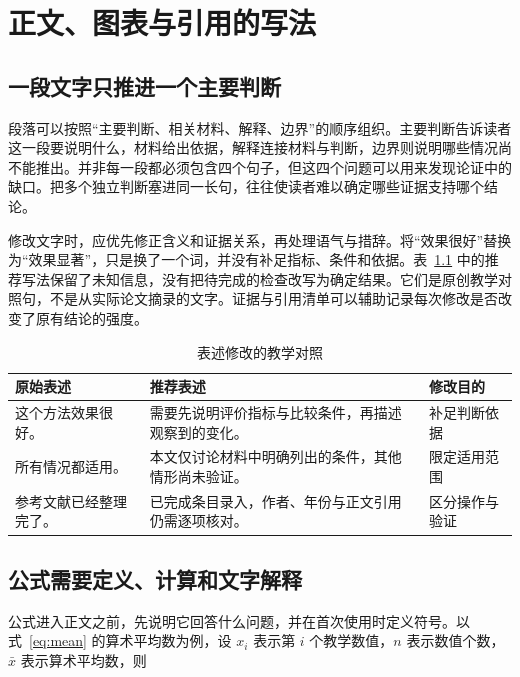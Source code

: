 \chapter{正文、图表与引用的写法}
\label{chap:guide2}

\section{一段文字只推进一个主要判断}

段落可以按照“主要判断、相关材料、解释、边界”的顺序组织。主要判断告诉读者这一段要说明什么，材料给出依据，解释连接材料与判断，边界则说明哪些情况尚不能推出。并非每一段都必须包含四个句子，但这四个问题可以用来发现论证中的缺口。把多个独立判断塞进同一长句，往往使读者难以确定哪些证据支持哪个结论。

修改文字时，应优先修正含义和证据关系，再处理语气与措辞。将“效果很好”替换为“效果显著”，只是换了一个词，并没有补足指标、条件和依据。表~\ref{tab:guide2} 中的推荐写法保留了未知信息，没有把待完成的检查改写为确定结果。它们是原创教学对照句，不是从实际论文摘录的文字。证据与引用清单可以辅助记录每次修改是否改变了原有结论的强度。\cite{guide2}

\begin{table}[htbp]
  \centering
  \small
  \renewcommand{\arraystretch}{1.25}
  \caption{表述修改的教学对照}
  \label{tab:guide2}
  \begin{tabular}{@{}>{\raggedright\arraybackslash}p{.2\linewidth}>{\raggedright\arraybackslash}p{.52\linewidth}>{\raggedright\arraybackslash}p{.2\linewidth}@{}}
    \toprule
    原始表述 & 推荐表述 & 修改目的 \\
    \midrule
    这个方法效果很好。 & 需要先说明评价指标与比较条件，再描述观察到的变化。 & 补足判断依据 \\
    所有情况都适用。 & 本文仅讨论材料中明确列出的条件，其他情形尚未验证。 & 限定适用范围 \\
    参考文献已经整理完了。 & 已完成条目录入，作者、年份与正文引用仍需逐项核对。 & 区分操作与验证 \\
    \bottomrule
  \end{tabular}
\end{table}

\section{公式需要定义、计算和文字解释}

公式进入正文之前，先说明它回答什么问题，并在首次使用时定义符号。以式~\eqref{eq:mean} 的算术平均数为例，设 $x_i$ 表示第 $i$ 个教学数值，$n$ 表示数值个数，$\bar{x}$ 表示算术平均数，则

